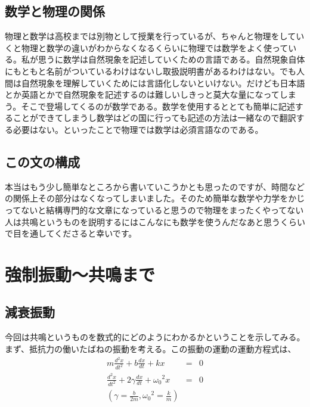 \clearpage

\section*{数学と物理の関係}
物理と数学は高校までは別物として授業を行っているが、ちゃんと物理をしていくと物理と数学の違いがわからなくなるくらいに物理では数学をよく使っている。私が思うに数学は自然現象を記述していくための言語である。自然現象自体にもともと名前がついているわけはないし取扱説明書があるわけはない。でも人間は自然現象を理解していくためには言語化しないといけない。だけども日本語とか英語とかで自然現象を記述するのは難しいしきっと莫大な量になってしまう。そこで登場してくるのが数学である。数学を使用するととても簡単に記述することができてしまうし数学はどの国に行っても記述の方法は一緒なので翻訳する必要はない。といったことで物理では数学は必須言語なのである。
\section*{この文の構成}
本当はもう少し簡単なところから書いていこうかとも思ったのですが、時間などの関係上その部分はなくなってしまいました。そのため簡単な数学や力学をかじってないと結構専門的な文章になっていると思うので物理をまったくやってない人は共鳴というものを説明するにはこんなにも数学を使うんだなあと思うくらいで目を通してくださると幸いです。



\newpage

\chapter{強制振動～共鳴まで}
\section{減衰振動}
今回は共鳴というものを数式的にどのようにわかるかということを示してみる。\\
まず、抵抗力の働いたばねの振動を考える。この振動の運動の運動方程式は、
\begin{eqnarray}
m\frac{d^2x}{dt^2}+b \frac{dx}{dt} + kx&=&0 \\
\frac{d^2x}{dt^2}+2\gamma \frac{dx}{dt} + {\omega_0}^2 x&=&0\\
\left(\gamma = \frac{b}{2m}　,  {\omega_0}^2  = \frac{k}{m} \right) \nonumber
\end{eqnarray}

